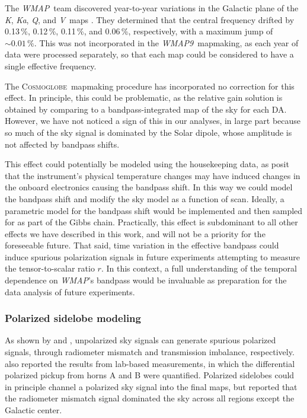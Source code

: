 \documentclass[twocolumn]{../../common/aa}
\def\WMAP{\emph{WMAP}}
\def\WMAPnine{\emph{WMAP9}}
\newcommand{\cosmoglobe}{\textsc{Cosmoglobe}}
\newcommand{\K}[0]{\textit K}
\newcommand{\Ka}[0]{\textit{Ka}}
\newcommand{\Q}[0]{\textit Q}
\newcommand{\V}[0]{\textit V}
\begin{document}
The \WMAP\ team discovered year-to-year variations in the Galactic plane of the \K, \Ka, \Q, and \V\ maps \citep[Appendix A]{bennett2012}. They determined that the central frequency drifted by 0.13\,\%, 0.12\,\%, 0.11\,\%, and 0.06\,\%, respectively, with a maximum jump of $\sim0.01\,\%$. This was not incorporated in the \WMAPnine\ mapmaking, as each year of data were processed separately, so that each map could be considered to have a single effective frequency.

The \cosmoglobe\ mapmaking procedure has incorporated no correction for this effect. In principle, this could be problematic, as the relative gain solution is obtained by comparing to a bandpass-integrated map of the sky for each DA. However, we have not noticed a sign of this in our analyses, in large part because so much of the sky signal is dominated by the Solar dipole, whose amplitude is not affected by bandpass shifts.

This effect could potentially be modeled using the housekeeping data, as \citet{bennett2012} posit that the instrument's physical temperature changes may have induced changes in the onboard electronics causing the bandpass shift. In this way we could model the bandpass shift and modify the sky model as a function of scan. Ideally, a parametric model for the bandpass shift would be implemented and then sampled for as part of the Gibbs chain. Practically, this effect is subdominant to all other effects we have described in this work, and will not be a priority for the foreseeable future. That said, time variation in the effective bandpass could induce spurious polarization signals in future experiments attempting to measure the tensor-to-scalar ratio $r$. In this context, a full understanding of the temporal dependence on \WMAP's bandpass would be invaluable as preparation for the data analysis of future experiments.

\subsubsection{Polarized sidelobe modeling}

As shown by \citet{barnes2003} and \citet{bp17}, unpolarized sky signals can generate spurious polarized signals, through radiometer mismatch and transmission imbalance, respectively. \citet{barnes2003} also reported the results from lab-based measurements, in which the differential polarized pickup from horns A and B were quantified. Polarized sidelobes could in principle channel a polarized sky signal into the final maps, but \citet{barnes2003} reported that the radiometer mismatch signal dominated the sky across all regions except the Galactic center.
\end{document}
